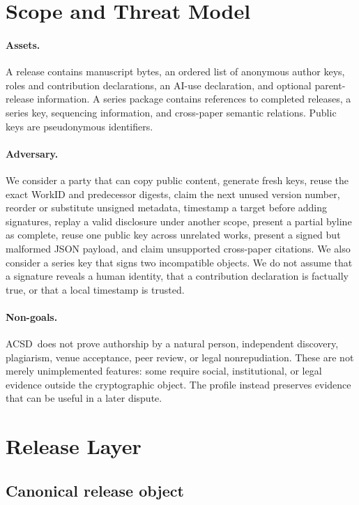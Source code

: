 \documentclass[11pt]{article}
\newcommand{\acsd}{\textsc{ACSD}}
\begin{document}
\section{Scope and Threat Model}

\paragraph{Assets.} A release contains manuscript bytes, an ordered list of anonymous author keys, roles and contribution declarations, an AI-use declaration, and optional parent-release information. A series package contains references to completed releases, a series key, sequencing information, and cross-paper semantic relations. Public keys are pseudonymous identifiers.

\paragraph{Adversary.} We consider a party that can copy public content, generate fresh keys, reuse the exact WorkID and predecessor digests, claim the next unused version number, reorder or substitute unsigned metadata, timestamp a target before adding signatures, replay a valid disclosure under another scope, present a partial byline as complete, reuse one public key across unrelated works, present a signed but malformed JSON payload, and claim unsupported cross-paper citations. We also consider a series key that signs two incompatible objects. We do not assume that a signature reveals a human identity, that a contribution declaration is factually true, or that a local timestamp is trusted.

\paragraph{Non-goals.} \acsd\ does not prove authorship by a natural person, independent discovery, plagiarism, venue acceptance, peer review, or legal nonrepudiation. These are not merely unimplemented features: some require social, institutional, or legal evidence outside the cryptographic object. The profile instead preserves evidence that can be useful in a later dispute.

\section{Release Layer}

\subsection{Canonical release object}
\end{document}
